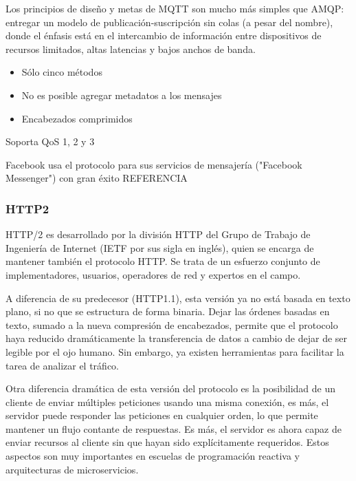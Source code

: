 Los principios de diseño y metas de MQTT son mucho más simples que AMQP: entregar un modelo de publicación-suscripción sin colas (a pesar del nombre), donde el énfasis está en el intercambio de información entre dispositivos de recursos limitados, altas latencias y bajos anchos de banda.

\begin{itemize}
  \item Sólo cinco métodos
  \item No es posible agregar metadatos a los mensajes
  \item Encabezados comprimidos
\end{itemize}

Soporta QoS 1, 2 y 3

Facebook usa el protocolo para sus servicios de mensajería ("Facebook Messenger") con gran éxito REFERENCIA

\subsubsection{HTTP2}

HTTP/2 es desarrollado por la división HTTP del Grupo de Trabajo de Ingeniería de Internet (IETF por sus sigla en inglés), quien se encarga de mantener también el protocolo HTTP. Se trata de un esfuerzo conjunto de implementadores, usuarios, operadores de red y expertos en el campo.

A diferencia de su predecesor (HTTP1.1), esta versión ya no está basada en texto plano, si no que se estructura de forma binaria. Dejar las órdenes basadas en texto, sumado a la nueva compresión de encabezados, permite que el protocolo haya reducido dramáticamente la transferencia de datos a cambio de dejar de ser legible por el ojo humano. Sin embargo, ya existen herramientas para facilitar la tarea de analizar el tráfico.

Otra diferencia dramática de esta versión del protocolo es la posibilidad de un cliente de enviar múltiples peticiones usando una misma conexión, es más, el servidor puede responder las peticiones en cualquier orden, lo que permite mantener un flujo contante de respuestas. Es más, el servidor es ahora capaz de enviar recursos al cliente sin que hayan sido explícitamente requeridos. Estos aspectos son muy importantes en escuelas de programación reactiva y arquitecturas de microservicios.


